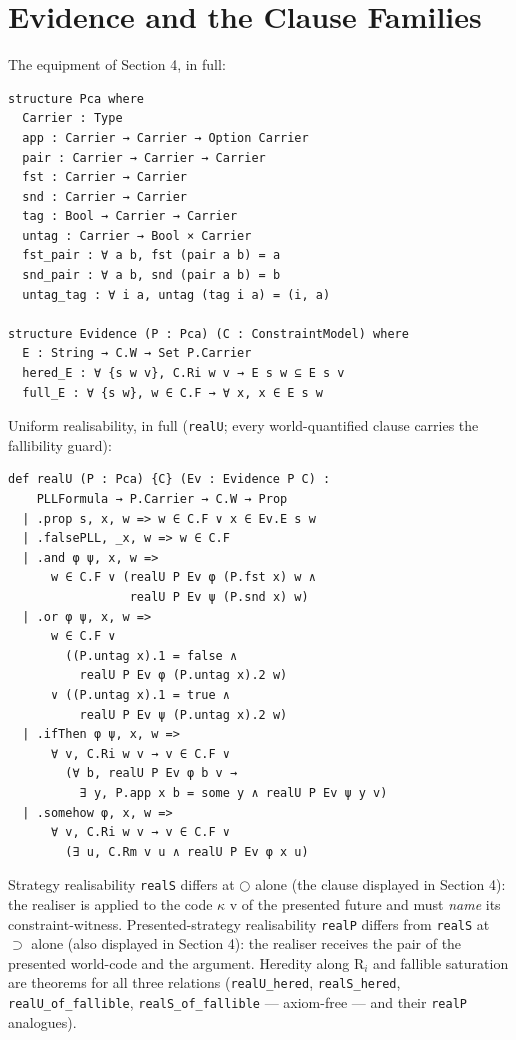 \section{Evidence and the Clause Families}\label{app:evidence}

The equipment of Section 4, in full:

\begin{lstlisting}
structure Pca where
  Carrier : Type
  app : Carrier → Carrier → Option Carrier
  pair : Carrier → Carrier → Carrier
  fst : Carrier → Carrier
  snd : Carrier → Carrier
  tag : Bool → Carrier → Carrier
  untag : Carrier → Bool × Carrier
  fst_pair : ∀ a b, fst (pair a b) = a
  snd_pair : ∀ a b, snd (pair a b) = b
  untag_tag : ∀ i a, untag (tag i a) = (i, a)

structure Evidence (P : Pca) (C : ConstraintModel) where
  E : String → C.W → Set P.Carrier
  hered_E : ∀ {s w v}, C.Ri w v → E s w ⊆ E s v
  full_E : ∀ {s w}, w ∈ C.F → ∀ x, x ∈ E s w
\end{lstlisting}

Uniform realisability, in full (\texttt{realU}; every world-quantified
clause carries the fallibility guard):

\begin{lstlisting}
def realU (P : Pca) {C} (Ev : Evidence P C) :
    PLLFormula → P.Carrier → C.W → Prop
  | .prop s, x, w => w ∈ C.F ∨ x ∈ Ev.E s w
  | .falsePLL, _x, w => w ∈ C.F
  | .and φ ψ, x, w =>
      w ∈ C.F ∨ (realU P Ev φ (P.fst x) w ∧
                 realU P Ev ψ (P.snd x) w)
  | .or φ ψ, x, w =>
      w ∈ C.F ∨
        ((P.untag x).1 = false ∧
          realU P Ev φ (P.untag x).2 w)
      ∨ ((P.untag x).1 = true ∧
          realU P Ev ψ (P.untag x).2 w)
  | .ifThen φ ψ, x, w =>
      ∀ v, C.Ri w v → v ∈ C.F ∨
        (∀ b, realU P Ev φ b v →
          ∃ y, P.app x b = some y ∧ realU P Ev ψ y v)
  | .somehow φ, x, w =>
      ∀ v, C.Ri w v → v ∈ C.F ∨
        (∃ u, C.Rm v u ∧ realU P Ev φ x u)
\end{lstlisting}

Strategy realisability \texttt{realS} differs at \ensuremath{\bigcirc} alone
(the clause displayed in Section 4): the realiser is applied to the
code \ensuremath{\kappa} v of the presented future and must \emph{name} its
constraint-witness. Presented-strategy realisability \texttt{realP}
differs from \texttt{realS} at \ensuremath{\supset} alone (also displayed in
Section 4): the realiser receives the pair of the presented world-code
and the argument. Heredity along R\ensuremath{{}_{i}} and fallible saturation are
theorems for all three relations (\texttt{realU\_hered},
\texttt{realS\_hered}, \texttt{realU\_of\_fallible},
\texttt{realS\_of\_fallible} — axiom-free — and their \texttt{realP}
analogues).

